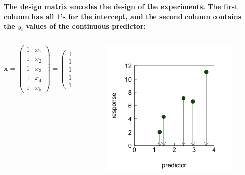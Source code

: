 \documentclass{beamer}
\begin{document}
\begin{frame}
    \frametitle{}
    \textbf{The design matrix encodes the design of the experiments. The first column has all 1's for the intercept, and the second column contains the $y_i$ values of the continuous predictor:}
    \begin{columns}
        \begin{column}{0.44\textwidth}
    \begin{equation*}
        \mathbf{x} = \left( \begin{array}{cc} 1 & x_1 \\ 1 & x_2 \\ 1 & x_3 \\ 1 & x_4 \\ 1 & x_5 \end{array}\right) = \left( \begin{array}{cc} 1 & 1.27 \\ 1 & 1.47 \\ 1 & 2.47 \\ 1 & 2.94 \\ 1 & 3.61 \end{array}\right)
    \end{equation*}
    \end{column}
    \begin{column}{0.44\textwidth}
    \begin{figure}[h]
        \centering
        \includegraphics[width=0.999\textwidth]{lectures/day_2_LM_refresh_I/figures/unnamed-chunk-13-1.png}
    \end{figure}
    \end{column}
    \end{columns}
\end{frame}
\end{document}
